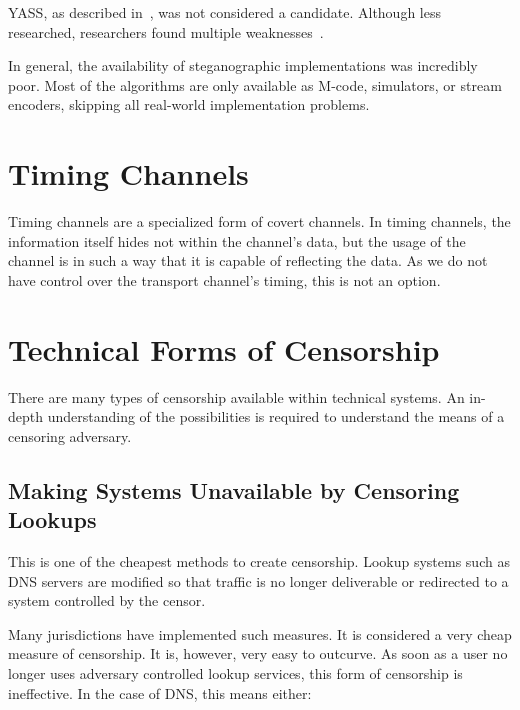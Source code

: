 
YASS, as described in~\cite{solanki2007yass}, was not considered a candidate. Although less researched, researchers found multiple weakness\-es~\cite{kodovsky2010modern,li2009steganalysis}.


In general, the availability of steganographic implementations was incredibly poor. Most of the algorithms are only available as M-code, simulators, or stream encoders, skipping all real-world implementation problems.

\section{Timing Channels}

Timing channels are a specialized form of covert channels. In timing channels, the information itself hides not within the channel's data, but the usage of the channel is in such a way that it is capable of reflecting the data. As we do not have control over the transport channel's timing, this is not an option.

\section{Technical Forms of Censorship}
There are many types of censorship available within technical systems. An in-depth understanding of the possibilities is required to understand the means of a censoring adversary.

\subsection{Making Systems Unavailable by Censoring Lookups}
This is one of the cheapest methods to create censorship. Lookup systems such as DNS servers are modified so that traffic is no longer deliverable or redirected to a system controlled by the censor.

Many jurisdictions have implemented such measures. It is considered a very cheap measure of censorship. It is, however, very easy to outcurve. As soon as a user no longer uses adversary controlled lookup services, this form of censorship is ineffective. In the case of DNS, this means either: 

